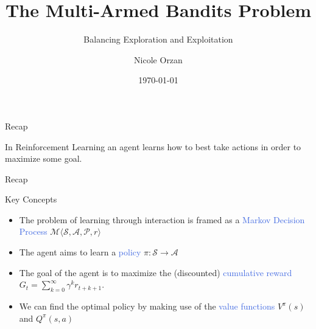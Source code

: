 \documentclass{beamer}
\title{The Multi-Armed Bandits Problem}
\subtitle{Balancing Exploration and Exploitation}
\author{Nicole Orzan}
\date{\today}
\begin{document}
\frame{\titlepage} 


\begin{frame}{Recap}

In Reinforcement Learning an agent learns how to best take actions in order to maximize some goal.

\vspace{2mm}

\begin{figure}

\end{figure}
\end{frame}


\begin{frame}{Recap}

\begin{block}{Key Concepts}
\begin{itemize}
	\item The problem of learning through interaction is framed as a \textcolor{RoyalBlue}{Markov Decision Process} $\mathcal{M}\langle \mathcal{S}, \mathcal{A}, \mathcal{P}, r \rangle$
	\item The agent aims to learn a \textcolor{RoyalBlue}{policy} $\pi: \mathcal{S}\rightarrow \mathcal{A}$
	\item The goal of the agent is to maximize the (discounted) \textcolor{RoyalBlue}{cumulative reward} $G_t = \sum_{k=0}^{\infty}\gamma^{k} r_{t+k+1}$.
	\item We can find the optimal policy by making use of the \textcolor{RoyalBlue}{value functions} $V^\pi(s)$ and $Q^\pi(s,a)$ 
\end{itemize}
\end{block}
\end{frame}


%

\end{document}

